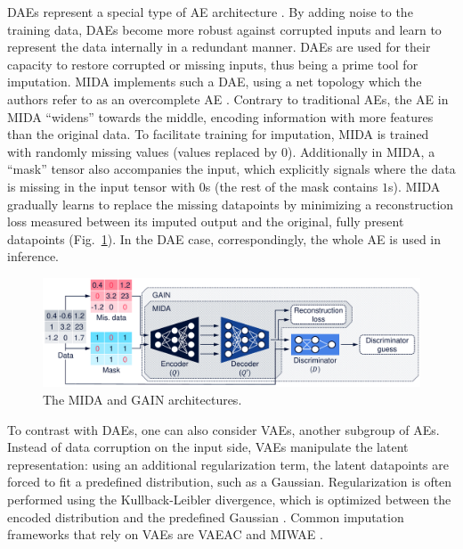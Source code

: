 				\acp{DAE} represent a special type of \ac{AE} architecture \cite{dae}.
				By adding noise to the training data, \acp{DAE} become more robust against corrupted inputs and learn to represent the data internally in a redundant manner.
				\acp{DAE} are used for their capacity to restore corrupted or missing inputs, thus being a prime tool for imputation.
				\ac{MIDA} implements such a \ac{DAE}, using a net topology which the authors refer to as an overcomplete \ac{AE} \cite{mida}.
				Contrary to traditional \acp{AE}, the \ac{AE} in \ac{MIDA} ``widens'' towards the middle, encoding information with more features than the original data.
				To facilitate training for imputation, \ac{MIDA} is trained with randomly missing values (values replaced by $0$).
				Additionally in \ac{MIDA}, a ``mask'' tensor also accompanies the input, which explicitly signals where the data is missing in the input tensor with $0$s (the rest of the mask contains $1$s). 
				\ac{MIDA} gradually learns to replace the missing datapoints by minimizing a reconstruction loss measured between its imputed output and the original, fully present datapoints (Fig.~\ref{fig:dl_imp}).
				In the \ac{DAE} case, correspondingly, the whole \ac{AE} is used in inference.

				\begin{figure}[ht]
					\centering
					\includegraphics[width=\linewidth]{figures/12_imputation/dl_imp/dl_imp.pdf}
					\caption[The MIDA and GAIN architectures]{The MIDA and GAIN architectures.}
					\label{fig:dl_imp}
				\end{figure}
					
				To contrast with \acp{DAE}, one can also consider \acp{VAE}, another subgroup of \acp{AE}.
				Instead of data corruption on the input side, \acp{VAE} manipulate the latent representation: using an additional regularization term, the latent datapoints are forced to fit a predefined distribution, such as a Gaussian.
				Regularization is often performed using the Kullback-Leibler divergence, which is optimized between the encoded distribution and the predefined Gaussian \cite{vae}. 
				Common imputation frameworks that rely on \acp{VAE} are \ac{VAEAC} \cite{vaeac} and \ac{MIWAE} \cite{miwae}.
				
